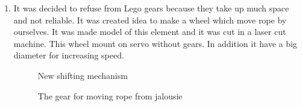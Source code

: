 \begin{enumerate}
   \item It was decided to refuse from Lego gears because they take up much space and not reliable. It was created idea to make a wheel which move rope by ourselves. It was made model of this element and it was cut in a laser cut machine. This wheel mount on servo without gears. In addition it have a big diameter for increasing speed.
   \begin{figure}[H]
   	\begin{minipage}[h]{0.49\linewidth}
   		\caption{New shifting mechanism}
   	\end{minipage} 
   	\begin{minipage}[h]{0.49\linewidth}
   		\caption{The gear for moving rope from jalousie}
   	\end{minipage}
   \end{figure}
   

\end{enumerate}
